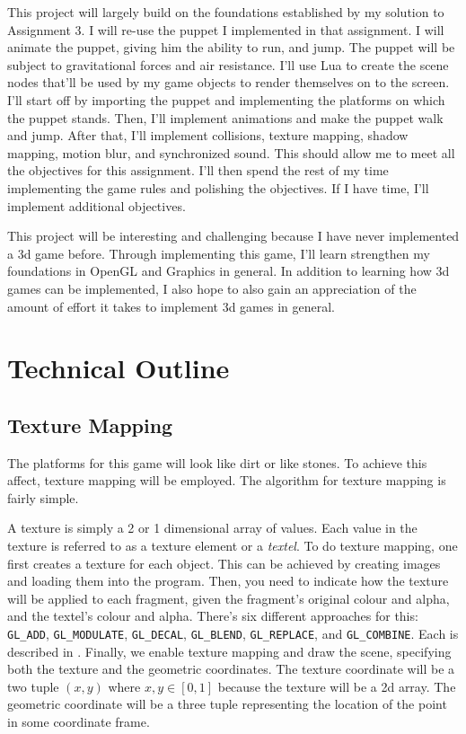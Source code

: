 \documentclass[11pt]{article}
\begin{document}
This project will largely build on the foundations established by my solution to Assignment 3. I will re-use the  puppet I implemented in that assignment. I will animate the puppet, giving him the ability to run, and jump. The puppet will be subject to gravitational forces and air resistance. I'll use Lua to create the scene nodes that'll be used by my game objects to render themselves on to the screen. I'll start off by importing the puppet and implementing the platforms on which the puppet stands. Then, I'll implement animations and make the puppet walk and jump. After that, I'll implement collisions, texture mapping, shadow mapping, motion blur, and synchronized sound. This should allow me to meet all the objectives for this assignment. I'll then spend the rest of my time implementing the game rules and polishing the objectives. If I have time, I'll implement additional objectives.

This project will be interesting and challenging because I have never implemented a 3d game before. Through implementing this game, I'll learn strengthen my foundations in OpenGL and Graphics in general. In addition to learning how 3d games can be implemented, I also hope to also gain an appreciation of the amount of effort it takes to implement 3d games in general. 

\section{Technical Outline}
\subsection{Texture Mapping}
The platforms for this game will look like dirt or like stones. To achieve this affect, texture mapping will be employed. The algorithm for texture mapping is fairly simple.

A texture is simply a 2 or 1 dimensional array of values. Each value in the texture is referred to as a texture element or a \textit{textel}. To do texture mapping, one first creates a texture for each object. This can be achieved by creating images and loading them into the program. Then, you need to indicate how the texture will be applied to each fragment, given the fragment's original colour and alpha, and the textel's colour and alpha. There's six different approaches for this: \verb|GL_ADD|, \verb|GL_MODULATE|, \verb|GL_DECAL|, \verb|GL_BLEND|, \verb|GL_REPLACE|, and \verb|GL_COMBINE|. Each is described in \cite{texture-map-fn}. Finally, we enable texture mapping and draw the scene, specifying both the texture and the geometric coordinates. The texture coordinate will be a two tuple $(x, y)$ where $x,y \in [0, 1]$ because the texture will be a 2d array. The geometric coordinate will be a three tuple representing the location of the point in some coordinate frame.
\end{document}
